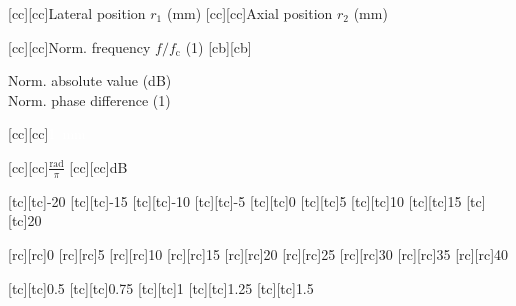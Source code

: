 [cc][cc]{\footnotesize Lateral position $r_{1}$ (\si{\milli\meter})}
[cc][cc]{\footnotesize Axial position $r_{2}$ (\si{\milli\meter})}

[cc][cc]{\footnotesize Norm. frequency $f / f_{\text{c}}$ (1)}
[cb][cb]{\footnotesize \parbox[b]{3.3cm}{\centering Norm. absolute value (\si{\deci\bel})\\Norm. phase difference (1)}}

[cc][cc]{\footnotesize \textcolor{white}{\SI{1}{\milli\meter}}}

[cc][cc]{\footnotesize $\frac{ \si{\radian} }{ \pi }$}
[cc][cc]{\footnotesize \si{\deci\bel}}

[tc][tc]{\scriptsize -20}
[tc][tc]{\scriptsize -15}
[tc][tc]{\scriptsize -10}
[tc][tc]{\scriptsize -5}
[tc][tc]{\scriptsize 0}
[tc][tc]{\scriptsize 5}
[tc][tc]{\scriptsize 10}
[tc][tc]{\scriptsize 15}
[tc][tc]{\scriptsize 20}

[rc][rc]{\scriptsize 0}
[rc][rc]{\scriptsize 5}
[rc][rc]{\scriptsize 10}
[rc][rc]{\scriptsize 15}
[rc][rc]{\scriptsize 20}
[rc][rc]{\scriptsize 25}
[rc][rc]{\scriptsize 30}
[rc][rc]{\scriptsize 35}
[rc][rc]{\scriptsize 40}

[tc][tc]{\scriptsize 0.5}
[tc][tc]{\scriptsize 0.75}
[tc][tc]{\scriptsize 1}
[tc][tc]{\scriptsize 1.25}
[tc][tc]{\scriptsize 1.5}

